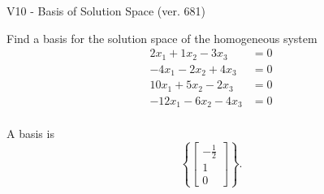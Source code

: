 \begin{exercise}
  \begin{exerciseTitle}V10 - Basis of Solution Space (ver. 681)\end{exerciseTitle}
  \begin{exerciseStatement}
    Find a basis for the solution space of the homogeneous system 
\begin{align*}
 2 x_ 1 + 1 x_ 2 -3 x_ 3 &= 0  \\ 
  -4 x_ 1 -2 x_ 2 + 4 x_ 3 &= 0  \\ 
  10 x_ 1 + 5 x_ 2 -2 x_ 3 &= 0  \\ 
  -12 x_ 1 -6 x_ 2 -4 x_ 3 &= 0  \\ 
 \end{align*}


 
  \end{exerciseStatement}

  \begin{exerciseAnswer}
   A basis is   
\[\left\{\left[\begin{array}{c}
-\frac{1}{2} \\
1 \\
0
\end{array}\right]\right\}.\]

  


  \end{exerciseAnswer}
\end{exercise}